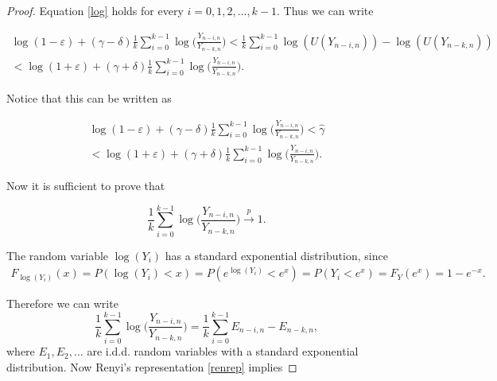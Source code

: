 \documentclass[english,12pt,a4paper,pdftex,sci,utf8]{aaltothesis} %
\begin{document}
\begin{proof}
Equation \eqref{log} holds for every $i = 0,1,2,..., k-1$. Thus we can write

\begin{equation*}
\begin{split}
\log(1 - \varepsilon) + (\gamma - \delta) \frac{1}{k} \sum_{i=0}^{k-1} \log\Big(\frac{Y_{n-i,n}}{Y_{n-k,n}}\Big) < \frac{1}{k} \sum_{i=0}^{k-1} \log(U(Y_{n-i,n})) - \log(U(Y_{n-k,n})) \\
< \log(1 + \varepsilon) + (\gamma + \delta) \frac{1}{k} \sum_{i=0}^{k-1} \log\Big(\frac{Y_{n-i,n}}{Y_{n-k,n}}\Big).
\end{split}
\end{equation*}

Notice that this can be written as

\begin{equation*}
\begin{split}
\log(1 - \varepsilon) + (\gamma - \delta) \frac{1}{k} \sum_{i=0}^{k-1} \log\Big(\frac{Y_{n-i,n}}{Y_{n-k,n}}\Big) < \hat{\gamma} \\
< \log(1 + \varepsilon) + (\gamma + \delta) \frac{1}{k} \sum_{i=0}^{k-1} \log\Big(\frac{Y_{n-i,n}}{Y_{n-k,n}}\Big).
\end{split}
\end{equation*}

Now it is sufficient to prove that 

\begin{equation*}
\frac{1}{k} \sum_{i=0}^{k-1} \log\Big(\frac{Y_{n-i,n}}{Y_{n-k,n}}\Big) \xrightarrow{p} 1.
\end{equation*}

The random variable $\log(Y_i)$ has a standard exponential distribution, since 
\begin{equation*}
\begin{split}
F_{\log(Y_i)}(x) = P(\log(Y_i) < x) = P(e^{\log(Y_i)} < e^x) = P(Y_i < e^x) = F_Y(e^x) = 1 - {e^{-x}}.
\end{split}
\end{equation*}

Therefore we can write
\begin{equation*}
\frac{1}{k} \sum_{i=0}^{k-1} \log\Big(\frac{Y_{n-i,n}}{Y_{n-k,n}}\Big) = \frac{1}{k} \sum_{i=0}^{k-1} E_{n-i,n} - E_{n-k,n},
\end{equation*}
where $E_1, E_2,...$ are i.d.d. random variables with a standard exponential distribution. Now Renyi's representation \ref{renrep} implies


\end{proof}
\end{document}
